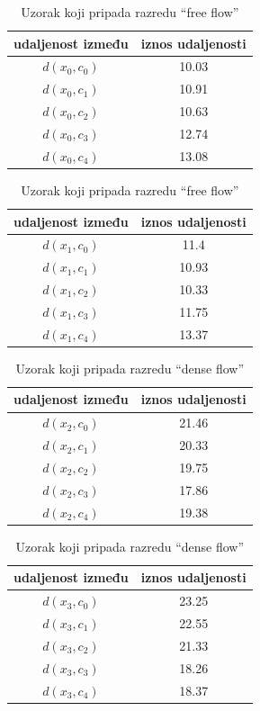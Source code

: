 \documentclass[times, utf8, zavrsni]{fer}
\begin{document}
\begin{table}[ht]
\parbox{.45\linewidth}{
\centering
\begin{tabular}{c|c}
udaljenost između & iznos udaljenosti \\
\hline
\(d(x_0, c_0)\) & 10.03 \\
\(d(x_0, c_1)\) & 10.91 \\
\(d(x_0, c_2)\) & 10.63 \\
\(d(x_0, c_3)\) & 12.74 \\
\(d(x_0, c_4)\) & 13.08 \\
\end{tabular}
\caption{Uzorak koji pripada razredu \enquote{no flow}}
}
\hfill
\parbox{.45\linewidth}{
\centering
\begin{tabular}{c|c}
udaljenost između & iznos udaljenosti \\
\hline
\(d(x_1, c_0)\) & 11.4 \\
\(d(x_1, c_1)\) & 10.93 \\
\(d(x_1, c_2)\) & 10.33 \\
\(d(x_1, c_3)\) & 11.75 \\
\(d(x_1, c_4)\) & 13.37 \\
\end{tabular}
\caption{Uzorak koji pripada razredu \enquote{free flow}}
}
\end{table}
\vspace{-1.5em}
\begin{table}[ht]
\parbox{.45\linewidth}{
\centering
\begin{tabular}{c|c}
udaljenost između & iznos udaljenosti \\
\hline
\(d(x_2, c_0)\) & 21.46 \\
\(d(x_2, c_1)\) & 20.33 \\
\(d(x_2, c_2)\) & 19.75 \\
\(d(x_2, c_3)\) & 17.86 \\
\(d(x_2, c_4)\) & 19.38 \\
\end{tabular}
\caption{Uzorak koji pripada razredu \enquote{restricted flow}}
}
\hfill
\parbox{.45\linewidth}{
\centering
\begin{tabular}{c|c}
udaljenost između & iznos udaljenosti \\
\hline
\(d(x_3, c_0)\) & 23.25 \\
\(d(x_3, c_1)\) & 22.55 \\
\(d(x_3, c_2)\) & 21.33 \\
\(d(x_3, c_3)\) & 18.26 \\
\(d(x_3, c_4)\) & 18.37 \\
\end{tabular}
\caption{Uzorak koji pripada razredu \enquote{dense flow}}
}
\end{table}
\end{document}
